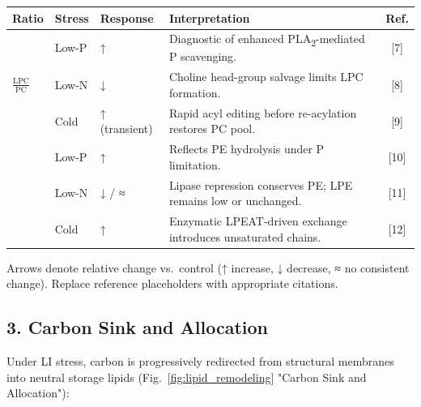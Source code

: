 \documentclass[10pt,letterpaper]{article}
\begin{document}
\begin{table}[!ht]
\begin{adjustwidth}{-2.25in}{0in}
    \vspace{-0.5em}
    \begin{tabularx}{\textwidth}{@{} l l p{3cm} X c @{}}
      \toprule
      \textbf{Ratio} & \textbf{Stress} & \textbf{Response} & \textbf{Interpretation} & \textbf{Ref.} \\
      \midrule
      \multirow{3}{*}{\(\tfrac{\mathrm{LPC}}{\mathrm{PC}}\)}
        & Low-P  & ↑            & Diagnostic of enhanced PLA\textsubscript{2}-mediated P scavenging. & [7] \\
        & Low-N  & ↓            & Choline head-group salvage limits LPC formation. & [8] \\
        & Cold   & ↑ (transient)& Rapid acyl editing before re-acylation restores PC pool. & [9] \\
      \addlinespace
      \multirow{3}{*}{\(\tfrac{\mathrm{LPE}}{\mathrm{PE}}\)}
        & Low-P  & ↑            & Reflects PE hydrolysis under P limitation. & [10] \\
        & Low-N  & ↓ / ≈        & Lipase repression conserves PE; LPE remains low or unchanged. & [11] \\
        & Cold   & ↑            & Enzymatic LPEAT-driven exchange introduces unsaturated chains. & [12] \\
      \bottomrule
    \end{tabularx}

    \vspace{0.5em}
    \begin{flushleft}
      {\footnotesize Arrows denote relative change vs.\ control (↑ increase, ↓ decrease, ≈ no consistent change).  
      Replace reference placeholders with appropriate citations.}
    \end{flushleft}
  \end{adjustwidth}
\end{table}



\subsection*{3. Carbon Sink and Allocation}

Under LI stress, carbon is progressively redirected from structural membranes into neutral storage lipids (Fig.~\ref{fig:lipid_remodeling} "Carbon Sink and Allocation"):
\end{document}
